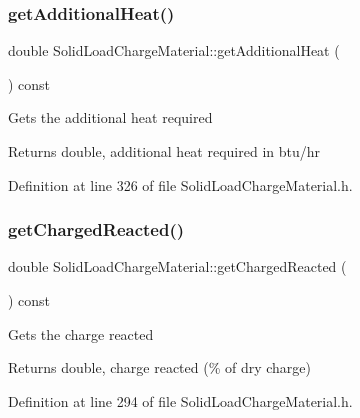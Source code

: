 \subsubsection{\texorpdfstring{get\+Additional\+Heat()}{getAdditionalHeat()}}
{\footnotesize\ttfamily double Solid\+Load\+Charge\+Material\+::get\+Additional\+Heat (\begin{DoxyParamCaption}{ }\end{DoxyParamCaption}) const\hspace{0.3cm}{\ttfamily [inline]}}

Gets the additional heat required \begin{DoxyReturn}{Returns}
double, additional heat required in btu/hr 
\end{DoxyReturn}


Definition at line 326 of file Solid\+Load\+Charge\+Material.\+h.

\mbox{\label{class_solid_load_charge_material_a7c7f05b6ee14eb5f07e5c48c30e9c7a1}} 
\subsubsection{\texorpdfstring{get\+Charged\+Reacted()}{getChargedReacted()}}
{\footnotesize\ttfamily double Solid\+Load\+Charge\+Material\+::get\+Charged\+Reacted (\begin{DoxyParamCaption}{ }\end{DoxyParamCaption}) const\hspace{0.3cm}{\ttfamily [inline]}}

Gets the charge reacted \begin{DoxyReturn}{Returns}
double, charge reacted (\% of dry charge) 
\end{DoxyReturn}


Definition at line 294 of file Solid\+Load\+Charge\+Material.\+h.

\mbox{\label{class_solid_load_charge_material_af6f018c5d67e94d86f2f57fecaa32b5c}} 

